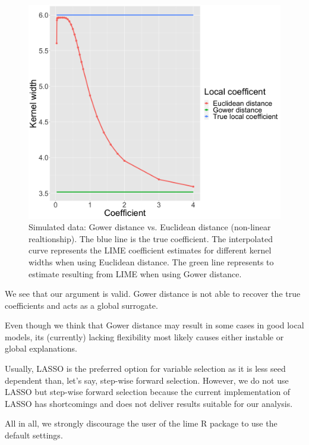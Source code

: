 \documentclass[
]{krantz}
\begin{document}
\begin{figure}

{\centering \includegraphics[width=0.99\linewidth]{images/04-09-16} 

}

\caption{Simulated data: Gower distance vs. Euclidean distance (non-linear realtionship). The blue line is the true coefficient. The interpolated curve represents the LIME coefficient estimates for different kernel widths when using Euclidean distance. The green line represents to estimate resulting from LIME when using Gower distance.}\label{fig:lime-fig15}
\end{figure}

We see that our argument is valid.
Gower distance is not able to recover the true coefficients and acts as a global surrogate.

Even though we think that Gower distance may result in some cases in good local models, its (currently) lacking flexibility most likely causes either instable or global explanations.

Usually, LASSO is the preferred option for variable selection as it is less seed dependent than, let's say, step-wise forward selection.
However, we do not use LASSO but step-wise forward selection because the current implementation of LASSO has shortcomings and does not deliver results suitable for our analysis.

All in all, we strongly discourage the user of the lime R package to use the default settings.
\end{document}
